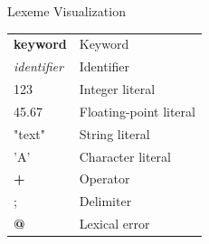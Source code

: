 \documentclass[aspectratio=169]{beamer}
\newcommand{\KW}[1]{\textcolor{keywordcolor}{\textbf{#1}}}
\newcommand{\ID}[1]{\textcolor{identifiercolor}{\textit{#1}}}
\newcommand{\INT}[1]{\colorbox{integercolor!15}{\textcolor{integercolor}{#1}}}
\newcommand{\FLOAT}[1]{\colorbox{floatcolor!15}{\textcolor{floatcolor}{#1}}}
\newcommand{\STR}[1]{\colorbox{stringcolor!12}{\textcolor{stringcolor}{#1}}}
\newcommand{\CHAR}[1]{\colorbox{charcolor!12}{\textcolor{charcolor}{#1}}}
\newcommand{\OP}[1]{\textcolor{operatorcolor}{\textbf{#1}}}
\newcommand{\DELIM}[1]{\textcolor{delimitercolor}{#1}}
\newcommand{\ERR}[1]{\colorbox{errorbackground}{\textcolor{errorcolor}{\textbf{#1}}}}
\begin{document}
\begin{frame}{Lexeme Visualization}
\small
\begin{tabular}{ll}
\KW{keyword} & Keyword \\
\ID{identifier} & Identifier \\
\INT{123} & Integer literal \\
\FLOAT{45.67} & Floating-point literal \\
\STR{"text"} & String literal \\
\CHAR{'A'} & Character literal \\
\OP{+} & Operator \\
\DELIM{;} & Delimiter \\
\ERR{@} & Lexical error \\
\end{tabular}
\end{frame}
\end{document}
